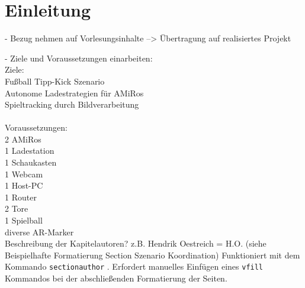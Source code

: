 \chapter{Einleitung} \label{kap:einleitung} %
- Bezug nehmen auf Vorlesungsinhalte --> Übertragung auf realisiertes Projekt

- Ziele und Voraussetzungen einarbeiten:\\
Ziele:\\
Fußball Tipp-Kick Szenario \\
Autonome Ladestrategien für AMiRos\\
Spieltracking durch Bildverarbeitung\\
\\
Voraussetzungen:\\
2 AMiRos\\
1 Ladestation\\
1 Schaukasten\\
1 Webcam\\
1 Host-PC\\
1 Router\\
2 Tore\\
1 Spielball\\
diverse AR-Marker\\

Beschreibung der Kapitelautoren?
z.B. Hendrik Oestreich = H.O.
(siehe Beispielhafte Formatierung Section Szenario Koordination)
Funktioniert mit dem Kommando \texttt{sectionauthor} . Erfordert manuelles Einfügen eines \texttt{vfill} Kommandos bei der abschließenden Formatierung der Seiten.